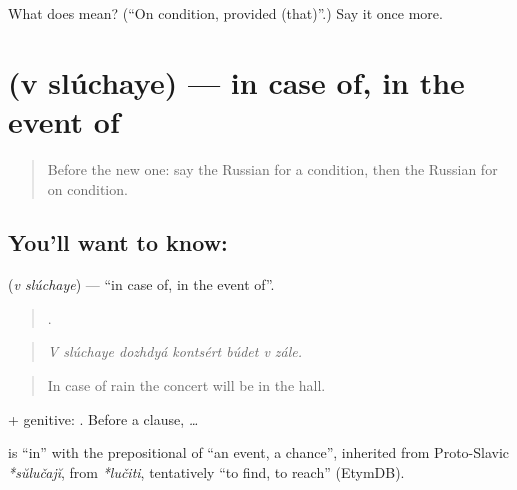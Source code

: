 \begin{tcolorbox}[breakable,colback=teal!4,colframe=teal!35!black,title={Before you move on}]
What does   mean? (\textquotedblleft{}On condition, provided (that)\textquotedblright{}.) Say it once more.
\end{tcolorbox}
\section[\texorpdfstring{\ru{в} \ru{случае} (v slúchaye)}{в случае (v slúchaye)}]{  (v slúchaye) — in case of, in the event of}

\label{lesson:RU-C370-v-sluchae}



\begin{quote}
Before the new one: say the Russian for a condition, then the Russian for on condition.
\end{quote}

\subsection*{You'll want to know:  }
\textbf{ } (\emph{v slúchaye}) — \textquotedblleft{}in case of, in the event of\textquotedblright{}.

\begin{quote}
      .
\end{quote}

\begin{quote}
\emph{V slúchaye dozhdyá kontsért búdet v zále.}
\end{quote}

\begin{quote}
In case of rain the concert will be in the hall.
\end{quote}

\emph{ } + genitive: \emph{  }. Before a clause, \emph{  …}

\begin{cousinweb}
\textbf{ } is \emph{} \textquotedblleft{}in\textquotedblright{} with the prepositional of \emph{} \textquotedblleft{}an event, a chance\textquotedblright{}, inherited from Proto-Slavic \emph{*sŭlučajĭ}, from \emph{*lučiti}, tentatively \textquotedblleft{}to find, to reach\textquotedblright{} (EtymDB).
\end{cousinweb}

